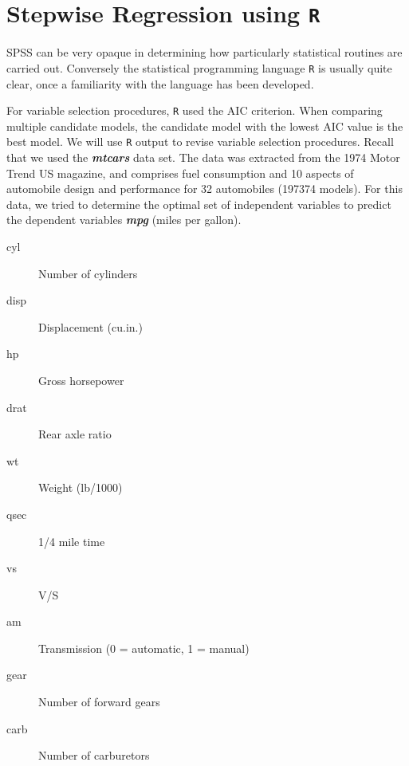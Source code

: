 \documentclass[a4paper,12pt]{article}
\begin{document}
\newpage
\section{Stepwise Regression using \texttt{R}}

SPSS can be very opaque in determining how particularly statistical routines are carried out. Conversely the statistical programming language \texttt{R} is usually quite clear, once a familiarity with the language has been developed.

For variable selection procedures, \texttt{R} used the AIC criterion. When comparing multiple candidate models, the candidate model with the lowest AIC value is the best model. We will use \texttt{R} output to revise variable selection procedures. Recall that we used the \textbf{\textit{mtcars}} data set. The data was extracted from the 1974 Motor Trend US magazine, and comprises fuel consumption and 10 aspects of automobile design and performance for 32 automobiles (197374 models). For this data, we tried to determine the optimal set of independent variables to predict the dependent variables \textbf{\textit{mpg}} (miles per gallon).

\begin{description}
	\item[cyl]  Number of cylinders
	\item[disp]	 Displacement (cu.in.)
	\item[hp]  Gross horsepower
	\item[drat]	 Rear axle ratio
	\item[wt] Weight (lb/1000)
	\item[qsec]	 1/4 mile time
	\item[vs] V/S
	\item[am] Transmission (0 = automatic, 1 = manual)
	\item[gear]	 Number of forward gears
	\item[carb]	  Number of carburetors
\end{description}
\end{document}
